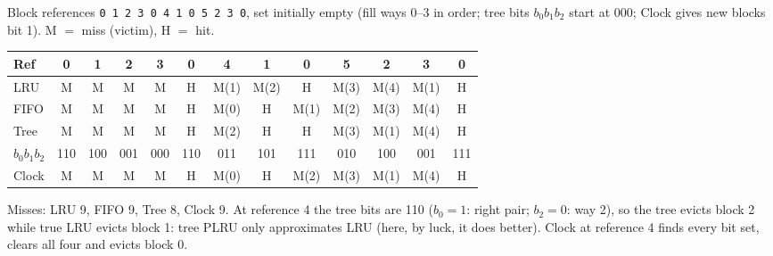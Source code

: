 \begin{eg}
Block references \texttt{0 1 2 3 0 4 1 0 5 2 3 0}, set initially empty (fill ways
0--3 in order; tree bits $b_0b_1b_2$ start at 000; Clock gives new blocks bit 1).
M $=$ miss (victim), H $=$ hit.
\begin{center}
\scriptsize
\setlength{\tabcolsep}{2.4pt}
\begin{tabular}{@{}lcccccccccccc@{}}
\toprule
Ref & 0 & 1 & 2 & 3 & 0 & 4 & 1 & 0 & 5 & 2 & 3 & 0 \\
\midrule
LRU & M & M & M & M & H & M(1) & M(2) & H & M(3) & M(4) & M(1) & H \\
FIFO & M & M & M & M & H & M(0) & H & M(1) & M(2) & M(3) & M(4) & H \\
Tree & M & M & M & M & H & M(2) & H & H & M(3) & M(1) & M(4) & H \\
\quad $b_0b_1b_2$ & 110 & 100 & 001 & 000 & 110 & 011 & 101 & 111 & 010 & 100 & 001 & 111 \\
Clock & M & M & M & M & H & M(0) & H & M(2) & M(3) & M(1) & M(4) & H \\
\bottomrule
\end{tabular}
\end{center}
Misses: LRU 9, FIFO 9, Tree 8, Clock 9. At reference 4 the tree bits are 110
($b_0=1$: right pair; $b_2=0$: way 2), so the tree evicts block 2 while true LRU
evicts block 1: tree PLRU only approximates LRU (here, by luck, it does better).
Clock at reference 4 finds every bit set, clears all four and evicts block 0.
\end{eg}

